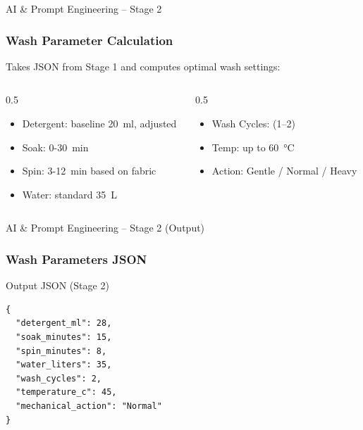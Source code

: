 \documentclass[aspectratio=169]{beamer}
\begin{document}
\begin{frame}[fragile]{AI \& Prompt Engineering – Stage 2}
\frametitle{Wash Parameter Calculation}
\small
Takes JSON from Stage 1 and computes optimal wash settings:

\begin{columns}[T]
\begin{column}{0.5\textwidth}
\begin{itemize}
    \item Detergent: baseline 20~ml, adjusted
    \item Soak: 0-30~min
    \item Spin: 3-12~min based on fabric
    \item Water: standard 35~L
\end{itemize}
\end{column}
\begin{column}{0.5\textwidth}
\begin{itemize}
    \item Wash Cycles: (1–2)
    \item Temp: up to 60~°C 
    \item Action: Gentle / Normal / Heavy
\end{itemize}
\end{column}
\end{columns}
\end{frame}

\begin{frame}[fragile]{AI \& Prompt Engineering – Stage 2 (Output)}
\frametitle{Wash Parameters JSON}
\begin{block}{Output JSON (Stage 2)}
\begin{verbatim}
{
  "detergent_ml": 28,
  "soak_minutes": 15,
  "spin_minutes": 8,
  "water_liters": 35,
  "wash_cycles": 2,
  "temperature_c": 45,
  "mechanical_action": "Normal"
}
\end{verbatim}
\end{block}
\end{frame}
\end{document}
